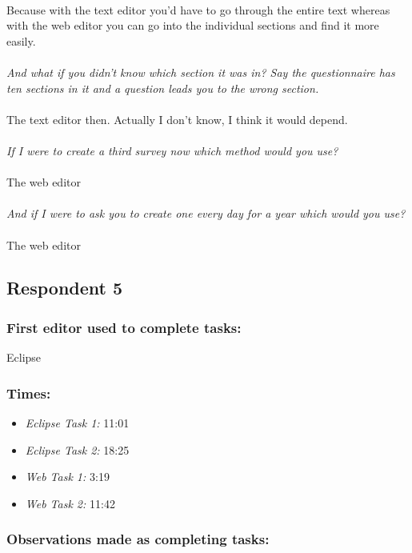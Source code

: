 \documentclass{report}
\begin{document}
\\
Because with the text editor you'd have to go through the entire text whereas with the web editor you can go into the individual sections and find it more easily.
\\
\\
\textit{And what if you didn't know which section it was in? Say the questionnaire has ten sections in it and a question leads you to the wrong section.}
\\
\\
The text editor then. Actually I don't know, I think it would depend.
\\
\\
\textit{If I were to create a third survey now which method would you use?}
\\
\\
The web editor
\\
\\
\textit{And if I were to ask you to create one every day for a year which would you use?}
\\
\\
The web editor
\subsection{Respondent 5}
\subsubsection*{First editor used to complete tasks:} Eclipse
\subsubsection*{Times:}
\begin{itemize}
\item \emph{Eclipse Task 1:} 11:01
\item \emph{Eclipse Task 2:} 18:25
\item \emph{Web Task 1:} 3:19
\item \emph{Web Task 2:} 11:42
\end{itemize}
\subsubsection*{Observations made as completing tasks:}
\end{document}
